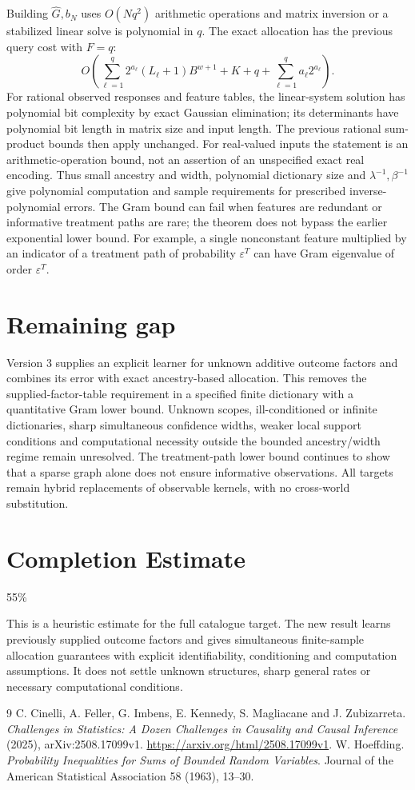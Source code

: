 \documentclass[11pt]{article}
\theoremstyle{definition}
\begin{document}
Building $\widehat G,b_N$ uses $O(Nq^2)$ arithmetic operations and
matrix inversion or a stabilized linear solve is polynomial in $q$.
The exact allocation has the previous query cost with $F=q$:
\[
 O\left(\sum_{\ell=1}^q2^{a_\ell}
                       (L_\ell+1)B^{w+1}
          +K+q+\sum_{\ell=1}^q a_\ell2^{a_\ell}\right).
\]
For rational observed responses and feature tables, the linear-system
solution has polynomial bit complexity by exact Gaussian elimination;
its determinants have polynomial bit length in matrix size and input
length. The previous rational sum-product bounds then apply unchanged.
For real-valued inputs the statement is an arithmetic-operation bound,
not an assertion of an unspecified exact real encoding.
Thus small ancestry and width, polynomial dictionary size and
$\lambda^{-1},\beta^{-1}$ give polynomial computation and sample
requirements for prescribed inverse-polynomial errors. The Gram bound
can fail when features are redundant or informative treatment paths are
rare; the theorem does not bypass the earlier exponential lower bound.
For example, a single nonconstant feature multiplied by an indicator of
a treatment path of probability $\varepsilon^T$ can have Gram eigenvalue
of order $\varepsilon^T$.

\section*{Remaining gap}
Version 3 supplies an explicit learner for unknown additive outcome factors
and combines its error with exact ancestry-based allocation. This removes
the supplied-factor-table requirement in a specified finite dictionary
with a quantitative Gram lower bound. Unknown scopes, ill-conditioned
or infinite dictionaries, sharp simultaneous confidence widths, weaker
local support conditions and computational necessity outside the bounded
ancestry/width regime remain unresolved. The treatment-path lower bound
continues to show that a sparse graph alone does not ensure informative
observations. All targets remain hybrid replacements of observable
kernels, with no cross-world substitution.

\section{Completion Estimate}
55\%

This is a heuristic estimate for the full catalogue target. The new result
learns previously supplied outcome factors and gives simultaneous finite-sample
allocation guarantees with explicit identifiability, conditioning and
computation assumptions. It does not settle unknown structures, sharp
general rates or necessary computational conditions.

\begin{thebibliography}{9}
 C. Cinelli, A. Feller, G. Imbens, E. Kennedy, S. Magliacane and J. Zubizarreta.
\emph{Challenges in Statistics: A Dozen Challenges in Causality and Causal Inference} (2025), arXiv:2508.17099v1.
\url{https://arxiv.org/html/2508.17099v1}.
 W. Hoeffding.
\emph{Probability Inequalities for Sums of Bounded Random Variables}.
Journal of the American Statistical Association 58 (1963), 13--30.
\end{thebibliography}
\end{document}

